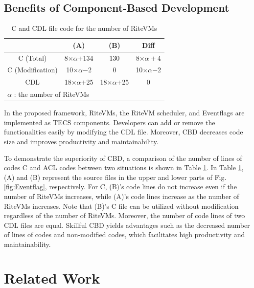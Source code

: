\documentclass[S,R,E]{article/compsoft}
\begin{document}
{\subsection{Benefits of Component-Based Development}

\begin{table}[t]
    \centering
    \caption{C and CDL file code for the number of RiteVMs}
    \footnotesize
    {\tabcolsep=0.1cm
    \begin{tabular}{c||c|c|c}
                       & (A)       & (B)     & Diff  \\ \hline
        C (Total)          & 8$\times$$\alpha$$+$134  & 130     & 8$\times$$\alpha+$4\\
        C (Modification)   & 10$\times\alpha$$-$2 & 0   &  10$\times\alpha$$-$2 \\
        CDL    & 18$\times$$\alpha$$+$25   & 18$\times$$\alpha$$+$25 & 0     \\
        \multicolumn{3}{l}{ $\alpha$ : the number of RiteVMs}
    \end{tabular}
    }
    \label{tab:codesize}
\end{table}

In the proposed framework, RiteVMs, the RiteVM scheduler, and Eventflags are implemented as TECS components.
Developers can add or remove the functionalities easily by modifying the CDL file.
Moreover, CBD decreases code size and improves productivity and maintainability.

To demonstrate the superiority of CBD, a comparison of the number of lines of codes C and ACL codes between two situations is shown in Table \ref{tab:codesize}.
In Table \ref{tab:codesize}, (A) and (B) represent the source files in the upper and lower parts of Fig.\ref{fig:Eventflag}, respectively. 
For C, (B)'s code lines do not increase even if the number of RiteVMs increases, while (A)'s code lines increase as the number of RiteVMs increases.
Note that (B)'s C file can be utilized without modification regardless of the number of RiteVMs.
Moreover, the number of code lines of two CDL files are equal.
Skillful CBD yields advantages such as the decreased number of lines of codes and non-modified codes, which facilitates high productivity and maintainability.

\section{Related Work}
\label{sec:Related work}

}
\end{document}
